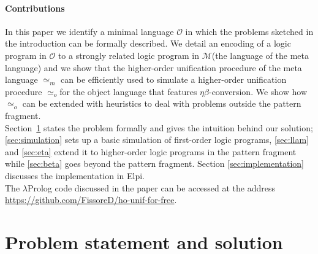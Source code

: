 \documentclass[sigconf,natbib=false,review]{acmart}
\def\githubUrl{\url{https://github.com/FissoreD/ho-unif-for-free}}
\newcommand{\UnifRel}{\ensuremath{\simeq}}
\newcommand{\Uo}{\texorpdfstring{\ensuremath{\UnifRel_o}\xspace}{unif\_o}}
\newcommand{\Ue}{\ensuremath{\UnifRel_m}\xspace}
\newcommand{\llambda}{\ensuremath{\mathcal{L}}\xspace}
\newcommand{\Fo}{\texorpdfstring{\ensuremath{\mathcal{O}\xspace}}{O}} %
\newcommand{\Ho}{\texorpdfstring{\ensuremath{\mathcal{M}}\xspace}{M}}
\begin{document}
\paragraph{Contributions}
In this paper we identify a minimal language \Fo{} in which the problems
sketched in the introduction can be formally described.
We detail an encoding of a logic program in \Fo{} to a strongly related
logic program in \Ho (the language of the meta language) and we show that
the higher-order unification procedure of the meta language \Ue{} can be
efficiently used to simulate a higher-order unification procedure \Uo for
the object language that features $\eta\beta$-conversion. We show how \Uo
can be extended with heuristics to deal with problems outside the pattern
fragment.\\
Section~\ref{sec:problem-statement} states the problem formally and gives the
intuition behind our solution; \cref{sec:simulation} sets up a basic
simulation of first-order logic programs, \cref{sec:llam} and \cref{sec:eta}
extend it to higher-order logic programs in the pattern fragment
while \cref{sec:beta} goes beyond the pattern fragment.
Section \ref{sec:implementation} discusses the implementation in Elpi.\\
The $\lambda$Prolog code discussed in the paper can be accessed at the
address \githubUrl.

\section{Problem statement and solution} %
\label{sec:problem-statement}

\newcommand{\specunif}[3]{
  \{#3_1, #3_2\} \subseteq \llambda \Rightarrow %
    \exists \rho, %
      \rho #3_1 #1 \rho #3_2  %
        \Leftrightarrow #3_1 #2 #3_2 \mapsto \rho' \subseteq \rho
}


\newcommand{\unifcorrectX}[4]{\ensuremath{
   #4 \Rightarrow
      #3_1 #2 #3_2 \mapsto \rho
        \Rightarrow
          \rho #3_1 #1 \rho #3_2  %
}}
\newcommand{\unifcorrect}[3]{\unifcorrectX{#1}{#2}{#3}{ \{#3_1, #3_2\} \subseteq \llambda}}

\newcommand{\unifcompleteX}[4]{\ensuremath{
    #4 \Rightarrow
        \rho #3_1 #1 \rho #3_2  %
          \Rightarrow \exists \rho', #3_1 #2 #3_2 \mapsto \rho' \land \rho' \subseteq \rho
}}
\newcommand{\unifcomplete}[3]{\unifcompleteX{#1}{#2}{#3}{\{#3_1, #3_2\} \subseteq \llambda}}
\end{document}
